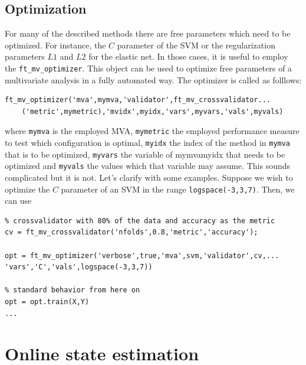 \documentclass{article}
\renewcommand{\t}[1]{{\tt #1}}
\begin{document}
\subsection{Optimization}

For many of the described methods there are free parameters which need to be optimized. For instance, the $C$ parameter of the SVM or  the regularization parameters $L1$ and $L2$ for the elastic net.  In those cases, it is useful to employ the \t{ft\_mv\_optimizer}.  This object can be used to optimize free parameters of a multivariate analysis in a fully automated way. The optimizer is called as folllows:
\begin{verbatim}
ft_mv_optimizer('mva',mymva,'validator',ft_mv_crossvalidator...
	('metric',mymetric),'mvidx',myidx,'vars',myvars,'vals',myvals)
\end{verbatim}
where \t{mymva} is the employed MVA, \t{mymetric} the employed performance measure to test which configuration is optimal, \t{myidx} the index of the method in \t{mymva} that is to be optimized, \t{myvars} the variable of mymva{myidx} that needs to be optimized and \t{myvals} the values which that variable may assume. This sounds complicated but it is not. Let's clarify with some examples. Suppose we wish to optimize the $C$ parameter of an SVM in the range \t{logspace(-3,3,7)}. Then, we can use 
\begin{verbatim}
% crossvalidator with 80% of the data and accuracy as the metric
cv = ft_mv_crossvalidator('nfolds',0.8,'metric','accuracy'); 

opt = ft_mv_optimizer('verbose',true,'mva',svm,'validator',cv,...
'vars','C','vals',logspace(-3,3,7))

% standard behavior from here on
opt = opt.train(X,Y) 
...
\end{verbatim}




\section{Online state estimation}
\end{document}
